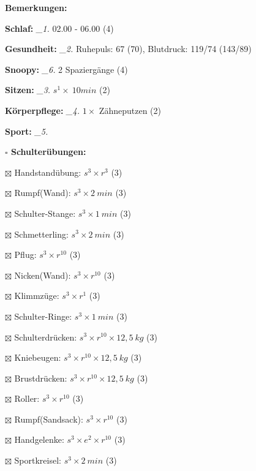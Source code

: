 \documentclass[10pt,a4paper]{article}
\newcommand\prop[1] {{\color {alizarin} {\bf #1}}}             %
\newcommand\mand[1] {{\color {burntorange} {\bf #1}}}          %
\newcommand\topspace{\vskip -15pt \hskip 20pt}
\newcommand\n[1] { {\sl #1.} \hskip 5pt }
\begin{document}
\begin{mdframed}[style=daystyle]
  \begin{labeling}{{\mand {Bemerkungen:}}}
    \setlength\itemsep{-3pt}
  \item[{\mand {Schlaf:}}]        \n{\_1} 02.00 - 06.00 (4)
  \item[{\mand {Gesundheit:}}]    \n{\_2} Ruhepuls: 67 (70), Blutdruck: 119/74 (143/89)
  \item[{\mand {Snoopy:}}]        \n{\_6} 2 Spaziergänge (4)
  \item[{\mand {Sitzen:}}]        \n{\_3} $s^1 \times\ 10 min$ (2)
  \item[{\mand {Körperpflege:}}]  \n{\_4} $1 \times$ Zähneputzen (2)
  \item[{\mand {Sport:}}]         \n{\_5}
    \topspace
    \begin{minipage}{0.75\textwidth}  
      \begin{labeling}{\prop {$\square$ {Schulterübungen:}}} 
        \setlength\itemsep{-3pt}
      \item[$\boxtimes$ Handstandübung:]  $s^3 \times r^{3}$ (3)
      \item[$\boxtimes$ Rumpf(Wand):]     $s^3 \times 2\ min$ (3)
      \item[$\boxtimes$ Schulter-Stange:] $s^3 \times 1\ min$ (3)
      \item[$\boxtimes$ Schmetterling:]   $s^3 \times 2\ min$ (3)
      \item[$\boxtimes$ Pflug:]           $s^3 \times r^{10}$ (3)
      \item[$\boxtimes$ Nicken(Wand):]    $s^3 \times r^{10}$ (3)
      \item[$\boxtimes$ Klimmzüge:]       $s^3 \times r^1$ (3)
      \item[$\boxtimes$ Schulter-Ringe:]  $s^3 \times 1\ min$ (3)
      \item[$\boxtimes$ Schulterdrücken:] $s^3 \times r^{10} \times 12,5\ kg$ (3)
      \item[$\boxtimes$ Kniebeugen:]      $s^3 \times r^{10} \times 12,5\ kg$ (3)
      \item[$\boxtimes$ Brustdrücken:]    $s^3 \times r^{10} \times 12,5\ kg$ (3)
      \item[$\boxtimes$ Roller:]          $s^3 \times r^{10}$ (3)
      \item[$\boxtimes$ Rumpf(Sandsack):] $s^3 \times r^{10}$ (3)
      \item[$\boxtimes$ Handgelenke:]     $s^3 \times e^2 \times r^{10}$ (3)
      \item[$\boxtimes$ Sportkreisel:]    $s^3 \times 2\ min$ (3)

\end{labeling}
\end{minipage}
\end{labeling}
\end{mdframed}
\end{document}
